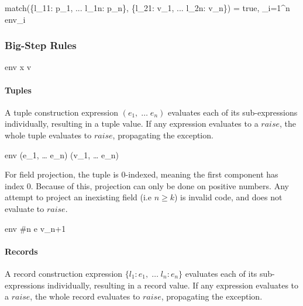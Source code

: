 \documentclass{article}
\begin{document}
    {match(\{l_{11}: p_1, ... l_{1n}: p_n\}, \{l_{21}: v_1, ... l_{2n}: v_n\}) = true,  \displaystyle \bigcup_{i=1}^{n} env_i}

\subsubsection{Big-Step Rules}




    {\mbox{env} \vdash x \Downarrow v}


\paragraph{Tuples}
A tuple construction expression $(e_1, \; \dots \; e_n)$ evaluates each of its sub-expressions individually, resulting in a tuple value.
If any expression evaluates to a $raise$, the whole tuple evaluates to $raise$, propagating the exception.

    {\mbox{env} \vdash (e_1, \; \dots \; e_n) \Downarrow (v_1, \; \dots \; e_n)}

For field projection, the tuple is 0-indexed, meaning the first component has index 0.
Because of this, projection can only be done on positive numbers.
Any attempt to project an inexisting field (i.e $n \geq k$) is invalid code, and does not evaluate to $raise$.

    {\mbox{env} \vdash \#n \; e \Downarrow v_{n+1}}

\paragraph{Records}
A record construction expression $\{l_1: e_1, \; \dots \; l_n: e_n\}$ evaluates each of its sub-expressions individually, resulting in a record value.
If any expression evaluates to a $raise$, the whole record evaluates to $raise$, propagating the exception.
\end{document}
